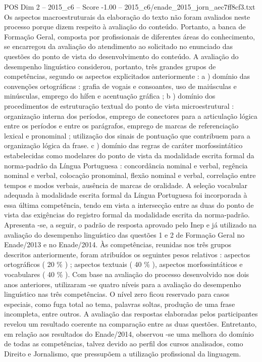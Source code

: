 \begin{textsample}{POS Dim 2 – 2015\_c6 – Score -1.00 – 2015\_c6/enade\_2015\_jorn\_aec7ff8cf3.txt}
Os aspectos macroestruturais da elaboração do texto não foram avaliados neste processo porque dizem respeito à avaliação do conteúdo.
Portanto, a banca de Formação Geral, composta por profissionais de diferentes áreas do conhecimento, se encarregou da avaliação do atendimento ao solicitado no enunciado das questões do ponto de vista do desenvolvimento do conteúdo.
A avaliação do desempenho linguístico considerou, portanto, três grandes grupos de competências, segundo os aspectos explicitados anteriormente : a ) domínio das convenções ortográficas : grafia de vogais e consoantes, uso de maiúsculas e minúsculas, emprego do hífen e acentuação gráfica ; b ) domínio dos procedimentos de estruturação textual do ponto de vista microestrutural : organização interna dos períodos, emprego de conectores para a articulação lógica entre os períodos e entre os parágrafos, emprego de marcas de referenciação lexical e pronominal ; utilização dos sinais de pontuação que contribuem para a organização lógica da frase. c ) domínio das regras de caráter morfossintático estabelecidas como modelares do ponto de vista da modalidade escrita formal da norma-padrão da Língua Portuguesa : concordância nominal e verbal, regência nominal e verbal, colocação pronominal, flexão nominal e verbal, correlação entre tempos e modos verbais, ausência de marcas de oralidade.
A seleção vocabular adequada à modalidade escrita formal da Língua Portuguesa foi incorporada à essa última competência, tendo em vista a intersecção entre as duas do ponto de vista das exigências do registro formal da modalidade escrita da norma-padrão.
Apresenta -se, a seguir, o padrão de resposta aprovado pelo Inep e já utilizado na avaliação do desempenho linguístico das questões 1 e 2 de Formação Geral no Enade/2013 e no Enade/2014.
Às competências, reunidas nos três grupos descritos anteriormente, foram atribuídos os seguintes pesos relativos : aspectos ortográficos ( 20 \% ) ; aspectos textuais ( 40 \% ), aspectos morfossintáticos e vocabulares ( 40 \% ).
Com base na avaliação do processo desenvolvido nos dois anos anteriores, utilizaram -se quatro níveis para a avaliação do desempenho linguístico nas três competências.
O nível zero ficou reservado para casos especiais, como fuga total ao tema, palavras soltas, produção de uma frase incompleta, entre outros.
A avaliação das respostas elaboradas pelos participantes revelou um resultado coerente na comparação entre as duas questões.
Entretanto, em relação aos resultados do Enade/2014, observou -se uma melhora do domínio de todas as competências, talvez devido ao perfil dos cursos analisados, como Direito e Jornalismo, que pressupõem a utilização profissional da linguagem.

\end{textsample}
